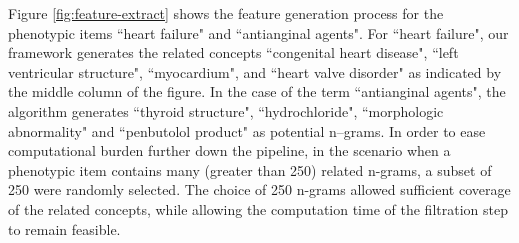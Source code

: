 \documentclass{sig-alternate}
\begin{document}
Figure \ref{fig:feature-extract} shows the feature generation process for the phenotypic items ``heart failure" and ``antianginal agents".
For ``heart failure", our framework generates the related concepts ``congenital heart disease", ``left ventricular structure", ``myocardium", and ``heart valve disorder" as indicated by the middle column of the figure.
In the case of the term ``antianginal agents", the algorithm generates ``thyroid structure", ``hydrochloride", ``morphologic abnormality" and ``penbutolol product" as potential n--grams.
In order to ease computational burden further down the pipeline, in the scenario when a phenotypic item contains many (greater than 250) related n-grams, a subset of 250 were randomly selected.
The choice of 250 n-grams allowed sufficient coverage of the related concepts, while allowing the computation time of the filtration step to remain feasible.


\end{document}

